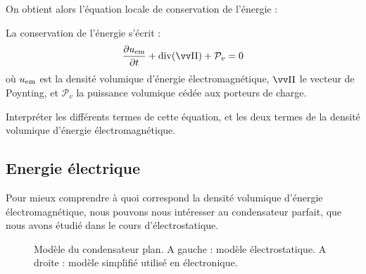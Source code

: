 \documentclass[11pt,fleqn]{book} %
\renewcommand{\div}{\mathrm{div}}
\begin{document}
On obtient alors l'équation locale de conservation de l'énergie :
\begin{theorem}
	La conservation de l'énergie s'écrit :
	\begin{equation}
		\frac{\partial u_{\rm em}}{\partial t} + \div(\vv \Pi) + \mathcal{P}_v = 0
	\end{equation}
	où $u_{\rm em}$ est la densité volumique d'énergie électromagnétique, $\vv \Pi$ le vecteur de Poynting, et $\mathcal{P}_v$ la puissance volumique cédée aux porteurs de charge.
\end{theorem}

\begin{capex}
	Interpréter les différents termes de cette équation, et les deux termes de la densité volumique d'énergie électromagnétique.
\end{capex}

\subsection{Energie électrique}

Pour mieux comprendre à quoi correspond la densité volumique d'énergie électromagnétique, nous pouvons nous intéresser au condensateur parfait, que nous avons étudié dans le cours d'électrostatique.

\begin{figure}[htbp]
	\centering
	
	 \hspace{1cm} 
	
	\caption{Modèle du condensateur plan. A gauche : modèle électrostatique. A droite : modèle simplifié utilisé en électronique.}
	\label{fig:condensateur}
\end{figure}
\end{document}
